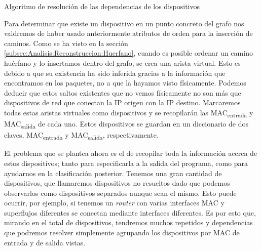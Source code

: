 \documentclass[tfg,epsbased,lof,lot,loa,covers,final,copyright,overleaf]{tfgtfmthesisuam}
\begin{document}
\begin{algorithm}{}{Algoritmo de resolución de las dependencias de los dispositivos}
\end{algorithm}

Para determinar que existe un dispositivo en un punto concreto del grafo nos valdremos de haber usado anteriormente atributos de orden para la inserción de caminos. Como se ha visto en la sección \ref{subsec:Analisis:Reconstruccion:Huerfano}, cuando es posible ordenar un camino huérfano y lo insertamos dentro del grafo, se crea una arista virtual. Esto es debido a que su existencia ha sido inferida gracias a la información que encontramos en los paquetes, no a que la hayamos visto físicamente. Podemos deducir que estos saltos existentes que no vemos físicamente no son más que dispositivos de red que conectan la IP origen con la IP destino. Marcaremos todas estas aristas virtuales como dispositivos y se recopilarán las MAC\textsubscript{entrada} y MAC\textsubscript{salida} de cada uno. Estos dispositivos se guardan en un diccionario de dos claves, MAC\textsubscript{entrada} y MAC\textsubscript{salida}, respectivamente.

El problema que se plantea ahora es el de recopilar toda la información acerca de estos dispositivos; tanto para especificarla a la salida del programa, como para ayudarnos en la clasificación posterior. Tenemos una gran cantidad de dispositivos, que llamaremos dispositivos no resueltos dado que podemos observarlos como dispositivos separados aunque sean el mismo. Esto puede ocurrir, por ejemplo, si tenemos un \textit{router} con varias interfaces MAC y superflujos diferentes se conectan mediante interfaces diferentes. Es por esto que, mirando en el total de dispositivos, tendremos muchos repetidos y dependencias que podremos resolver simplemente agrupando los dispositivos por MAC de entrada y de salida vistas.
\end{document}
